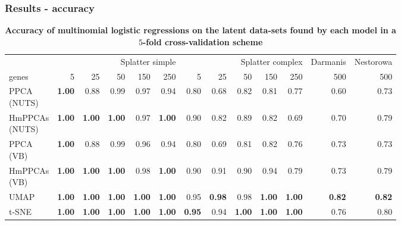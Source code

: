 \documentclass{beamer}
\begin{document}
\begin{frame}
\frametitle{Results - accuracy}

\begin{table}
\setlength{\tabcolsep}{3pt}
\caption{\tiny \textbf{Accuracy of multinomial logistic regressions on the latent data-sets found by each model in a $5$-fold cross-validation scheme}}
    \label{tab:results}
    \centering
\tiny
\begin{tabular}{l|rrrrr|rrrrr|r|r}
      & \multicolumn{5}{r}{Splatter simple} & \multicolumn{5}{r}{Splatter complex} & Darmanis & Nestorowa \\
      genes & 5 & 25 & 50 & 150 & 250 & 5 & 25 & 50 & 150 & 250 & 500 & 500 \\
      \hline
    
    \makecell{PPCA\\(NUTS)} & \textbf{1.00} & 0.88 & 0.99 & 0.97 & 0.94 &
    0.80 & 0.68 & 0.82 & 0.81 & 0.77 & 0.60 & 0.73\\
    
    \makecell{HmPPCAs\\(NUTS)} & \textbf{1.00} & \textbf{1.00} & \textbf{1.00} & 0.97 & \textbf{1.00} &
    0.90 & 0.82 & 0.89 & 0.82 & 0.69 & 0.70 & 0.79\\
    
    \makecell{PPCA\\(VB)} & \textbf{1.00} & 0.88 & 0.99 & 0.96 & 0.94 &
    0.80 & 0.69 & 0.81 & 0.82 & 0.76 & 0.73 & 0.73\\
    
    \makecell{HmPPCAs\\(VB)} & \textbf{1.00} & \textbf{1.00} & \textbf{1.00} & 0.98 & \textbf{1.00} &
    0.90 & 0.91 & 0.90 & 0.94 & 0.79 & 0.73 & 0.79\\
    
    UMAP & \textbf{1.00} & \textbf{1.00} & \textbf{1.00} & \textbf{1.00} & \textbf{1.00} &
    0.95 & \textbf{0.98} & 0.98 & \textbf{1.00} & \textbf{1.00} & \textbf{0.82} & \textbf{0.82}\\
    
    t-SNE & \textbf{1.00} & \textbf{1.00} & \textbf{1.00} & \textbf{1.00} & \textbf{1.00} & 
    \textbf{0.95} & 0.94 & \textbf{1.00} & \textbf{1.00} & \textbf{1.00} & 0.76 & 0.80\\
\end{tabular}
\end{table}

\end{frame}
\end{document}
